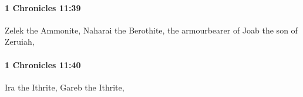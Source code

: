 		\paragraph{1 Chronicles 11:39} %
			\label{1CHRONICLES-11-39}

			Zelek the Ammonite, Naharai the Berothite, the armourbearer of Joab the son of Zeruiah,


		\paragraph{1 Chronicles 11:40} %
			\label{1CHRONICLES-11-40}

			Ira the Ithrite, Gareb the Ithrite,


